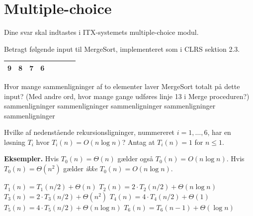 \section*{Multiple-choice}\label{sec:mc}

Dine svar skal indtastes i ITX-systemets multiple-choice modul.

\multiplechoicestart


Betragt følgende input til {\sc MergeSort}, implementeret som i CLRS sektion 2.3.
\begin{center}
\begin{tabular}{|c|c|c|c|c|c|c|c|}
\hline
9 & 8 & 7 & 6\\
\hline
\end{tabular}
\end{center}
Hvor mange sammenligninger af to elementer laver {\sc MergeSort} totalt på dette input?
(Med andre ord, hvor mange gange udføres linje 13 i {\sc Merge} proceduren?)
\etsvar
\mulighederstart
{} sammenligninger
 sammenligninger \korrekt
{} sammenligninger 
 sammenligninger
 sammenligninger
\mulighederslut
{}



Hvilke af nedenstående rekursionsligninger, nummereret $i=1,\dots,6$, har en løsning $T_i$ hvor $T_i(n) = O(n \log n)$?
Antag at $T_i(n) = 1$ for $n\leq 1$. \fleresvar

\medskip\noindent
{\bf Eksempler.} Hvis $T_0(n) = \Theta(n)$ gælder også $T_0(n) = O(n \log n)$. Hvis $T_0(n) = \Theta(n^2)$ gælder \emph{ikke} $T_0(n) = O(n \log n)$.

\mulighederstart
\svar $T_1(n) = T_1(n/2) + \Theta(n)$ \korrekt
\svar $T_2(n) = 2\cdot T_2(n/2) + \Theta(n \log n)$
\svar $T_3(n) = 2\cdot T_3(n/2) + \Theta(n^2)$
\svar $T_4(n) = 4\cdot T_4(n/2) + \Theta(1)$ 
\svar $T_5(n) = 4\cdot T_5(n/2) + \Theta(n \log n)$
\svar $T_6(n) = T_6(n-1) + \Theta(\log n)$ \korrekt
\mulighederslut




